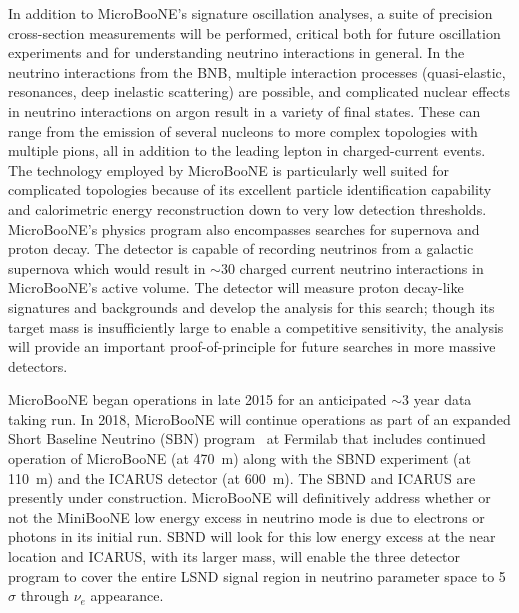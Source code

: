 
In addition to MicroBooNE's signature oscillation analyses, a suite of precision cross-section measurements will be performed, critical both for future \lartpc oscillation experiments and for understanding neutrino interactions in general.   In the neutrino interactions from the BNB, multiple interaction processes (quasi-elastic, resonances, deep inelastic scattering) are possible, and complicated nuclear effects in neutrino interactions on argon result in a variety of final states. These can range from the emission of several nucleons to more complex topologies with multiple pions, all in addition to the leading lepton in charged-current events. The \lartpc technology employed by MicroBooNE is particularly well suited for complicated topologies because of its excellent particle identification capability and calorimetric energy reconstruction down to very low detection thresholds. MicroBooNE's physics program also encompasses searches for supernova and proton decay.  The detector is capable of recording neutrinos from a galactic supernova which would result in $\sim$30 charged current neutrino interactions in MicroBooNE's active volume.   The detector will measure proton decay-like signatures and backgrounds and develop the analysis for this search; though its target mass is insufficiently large to enable a competitive sensitivity, the analysis will provide an important proof-of-principle for future searches in more massive detectors.  


MicroBooNE began operations in late 2015 for an anticipated $\sim$3 year data taking run.   In 2018, MicroBooNE will continue operations as part of an expanded Short Baseline Neutrino (SBN) program~\cite{Adams:2013-lar1nd} at Fermilab that includes continued operation of MicroBooNE (at 470~m) along with the SBND experiment (at 110~m)  and the ICARUS detector (at 600~m).  The SBND and ICARUS are presently under construction.  MicroBooNE will definitively address whether or not the MiniBooNE low energy excess in neutrino mode is due to electrons or photons in its initial run.  SBND will look for this low energy excess at the near location and ICARUS, with its larger mass, will enable the three detector program to cover the entire LSND signal region in neutrino parameter space to 5$\sigma$ through $\nu_e$ appearance.


